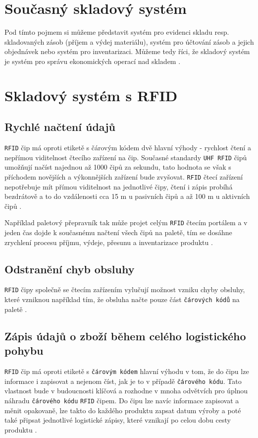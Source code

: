 \documentclass[czech,BP]{thesiskiv}
\begin{document}
\section{Současný skladový systém}
Pod tímto pojmem si můžeme představit systém pro evidenci skladu resp. skladovaných zásob (příjem  a  výdej  materiálu), systém pro účtování zásob a jejich objednávek nebo systém pro inventarizaci. Můžeme tedy říci, že skladový systém je systém pro správu ekonomických operací nad skladem \cite{hron2014skladovy}.

\section{Skladový systém s RFID}

\subsection{Rychlé načtení údajů}
\texttt{RFID} čip má oproti etiketě s čárovým kódem dvě hlavní výhody - rychlost čtení a nepřímou viditelnost čtecího zařízení na čip. Současné standardy \texttt{UHF RFID} čipů umožňují načíst najednou až 1000 čipů za sekundu, tato hodnota se však s příchodem novějších a výkonnějších zařízení bude zvyšovat. \texttt{RFID} čtecí zařízení nepotřebuje mít přímou viditelnost na jednotlivé čipy, čtení i zápis probíhá bezdrátově a to do vzdálenosti cca 15 m u pasivních čipů a až 100 m u aktivních čipů \cite{dolevcek2010identifikace}.

Například paletový přepravník tak může projet celým \texttt{RFID} čtecím portálem a v jeden čas dojde k současnému načtení všech čipů na paletě, tím se dosáhne zrychlení procesu příjmu, výdeje, přesunu a inventarizace produktu \cite{dolevcek2010identifikace}.

\subsection{Odstranění chyb obsluhy}
\texttt{RFID} čipy společně se čtecím zařízením vylučují možnost vzniku chyby obsluhy, které vzniknou například tím, že obsluha načte pouze část \texttt{čárových kódů} na paletě \cite{dolevcek2010identifikace}.

\subsection{Zápis údajů o zboží během celého logistického pohybu}
\texttt{RFID} čip má oproti etiketě s \texttt{čárovým kódem} hlavní výhodu v tom, že do čipu lze informace i zapisovat a nejenom číst, jak je to v případě \texttt{čárového kódu}. Tato vlastnost bude v budoucnosti klíčová a rozhodne v mnoha odvětvích pro úplnou náhradu \texttt{čárového kódu} \texttt{RFID} čipem. Do čipu lze navíc informace zapisovat a měnit opakovaně, lze takto do každého produktu zapsat datum výroby a poté také připsat jednotlivé logistické zápisy, které vznikají po celou dobu cesty produktu \cite{dolevcek2010identifikace}.
\end{document}
